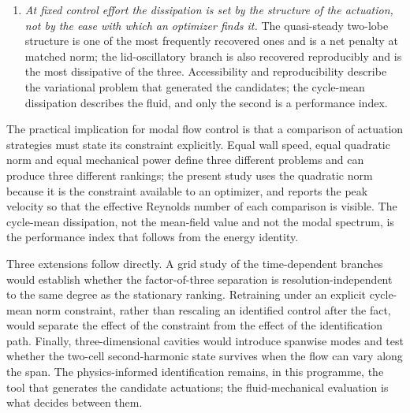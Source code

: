 \documentclass[11pt,a4paper]{article}
\newenvironment{chgadd}{\par\color{blue}}{\par\color{black}}
\newenvironment{chgdel}{\par\color{red}}{\par\color{black}}
\begin{document}
\begin{chgadd}
\begin{enumerate}
quasi-steady and mixed responses are nearly equal, differing by $2.1\%$ at
$N=256$ and by $0.5\%$ at $N=512$. The
second-Stokes estimate of Sec.~\ref{sec:scaling} reproduces the fluctuating
dissipation of the lid-oscillatory and mixed branches ($B_2$ and $B_3$) to within
approximately $5\%$ and $2\%$ from the imposed lid
signal alone, and the Reynolds-stress forcing of
Sec.~\ref{sec:topology} is spatially consistent with a steady-streaming mechanism,
although a closed mean-vorticity budget has not yet been established.
\item \emph{At fixed control effort the dissipation is set by the structure of the
actuation, not by the ease with which an optimizer finds it.} The quasi-steady
two-lobe structure is one of the most frequently recovered ones and is a net penalty at
matched norm; the lid-oscillatory branch is also recovered reproducibly and is the
most dissipative of the three. Accessibility and reproducibility describe the
variational problem that generated the candidates; the cycle-mean dissipation
describes the fluid, and only the second is a performance index.
\end{enumerate}
\end{chgadd}

The practical implication for modal flow control is that a comparison of actuation
strategies must state its constraint explicitly. Equal wall speed, equal quadratic
norm and equal mechanical power define three different problems and can produce
three different rankings; the present study uses the quadratic norm because it is
the constraint available to an optimizer, and reports the peak velocity so that
the effective Reynolds number of each comparison is visible. The cycle-mean
dissipation, not the mean-field value and not the modal spectrum, is the
performance index that follows from the energy identity.

\begin{chgdel}
Three extensions follow directly. A grid study of the time-dependent branches
would establish whether the factor-of-three separation is resolution-independent
to the same degree as the stationary ranking. Retraining under an explicit
cycle-mean norm constraint, rather than rescaling an identified control after the
fact, would separate the effect of the constraint from the effect of the
identification path. Finally, three-dimensional cavities would introduce spanwise
modes and test whether the two-cell second-harmonic state survives when the flow
can vary along the span. The physics-informed identification remains, in this
programme, the tool that generates the candidate actuations; the fluid-mechanical
evaluation is what decides between them.
\end{chgdel}
\end{document}
